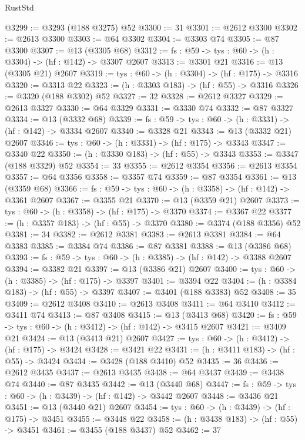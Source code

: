 \begin{lexlean}{RustStd}
\begin{coremodule}
@3299 := @3293 (@188 @3275) @52
@3300 := 31
@3301 := @2612 @3300
@3302 := @2613 @3300
@3303 := @64 @3302
@3304 := @3303 @74
@3305 := @87 @3300
@3307 := @13 (@3305 @68)
@3312 := {fs : @59} -> {tys : @60} -> (h : @3304) -> (hf : @142) -> @3307 @2607
@3313 := @3301 @21
@3316 := @13 (@3305 @21) @2607
@3319 := {tys : @60} -> (h : @3304) -> (hf : @175) -> @3316
@3320 := @3313 @22
@3323 := (h : @3303 @183) -> (hf : @55) -> @3316
@3326 := @3320 (@188 @3302) @52
@3327 := 32
@3328 := @2612 @3327
@3329 := @2613 @3327
@3330 := @64 @3329
@3331 := @3330 @74
@3332 := @87 @3327
@3334 := @13 (@3332 @68)
@3339 := {fs : @59} -> {tys : @60} -> (h : @3331) -> (hf : @142) -> @3334 @2607
@3340 := @3328 @21
@3343 := @13 (@3332 @21) @2607
@3346 := {tys : @60} -> (h : @3331) -> (hf : @175) -> @3343
@3347 := @3340 @22
@3350 := (h : @3330 @183) -> (hf : @55) -> @3343
@3353 := @3347 (@188 @3329) @52
@3354 := 33
@3355 := @2612 @3354
@3356 := @2613 @3354
@3357 := @64 @3356
@3358 := @3357 @74
@3359 := @87 @3354
@3361 := @13 (@3359 @68)
@3366 := {fs : @59} -> {tys : @60} -> (h : @3358) -> (hf : @142) -> @3361 @2607
@3367 := @3355 @21
@3370 := @13 (@3359 @21) @2607
@3373 := {tys : @60} -> (h : @3358) -> (hf : @175) -> @3370
@3374 := @3367 @22
@3377 := (h : @3357 @183) -> (hf : @55) -> @3370
@3380 := @3374 (@188 @3356) @52
@3381 := 34
@3382 := @2612 @3381
@3383 := @2613 @3381
@3384 := @64 @3383
@3385 := @3384 @74
@3386 := @87 @3381
@3388 := @13 (@3386 @68)
@3393 := {fs : @59} -> {tys : @60} -> (h : @3385) -> (hf : @142) -> @3388 @2607
@3394 := @3382 @21
@3397 := @13 (@3386 @21) @2607
@3400 := {tys : @60} -> (h : @3385) -> (hf : @175) -> @3397
@3401 := @3394 @22
@3404 := (h : @3384 @183) -> (hf : @55) -> @3397
@3407 := @3401 (@188 @3383) @52
@3408 := 35
@3409 := @2612 @3408
@3410 := @2613 @3408
@3411 := @64 @3410
@3412 := @3411 @74
@3413 := @87 @3408
@3415 := @13 (@3413 @68)
@3420 := {fs : @59} -> {tys : @60} -> (h : @3412) -> (hf : @142) -> @3415 @2607
@3421 := @3409 @21
@3424 := @13 (@3413 @21) @2607
@3427 := {tys : @60} -> (h : @3412) -> (hf : @175) -> @3424
@3428 := @3421 @22
@3431 := (h : @3411 @183) -> (hf : @55) -> @3424
@3434 := @3428 (@188 @3410) @52
@3435 := 36
@3436 := @2612 @3435
@3437 := @2613 @3435
@3438 := @64 @3437
@3439 := @3438 @74
@3440 := @87 @3435
@3442 := @13 (@3440 @68)
@3447 := {fs : @59} -> {tys : @60} -> (h : @3439) -> (hf : @142) -> @3442 @2607
@3448 := @3436 @21
@3451 := @13 (@3440 @21) @2607
@3454 := {tys : @60} -> (h : @3439) -> (hf : @175) -> @3451
@3455 := @3448 @22
@3458 := (h : @3438 @183) -> (hf : @55) -> @3451
@3461 := @3455 (@188 @3437) @52
@3462 := 37

\end{coremodule}
\end{lexlean}
